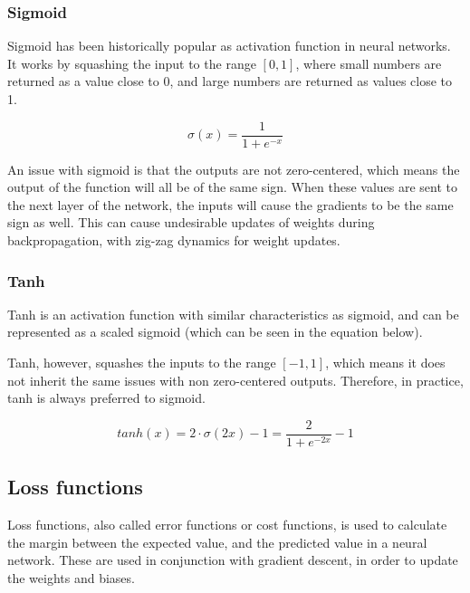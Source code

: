 \subsubsection{Sigmoid}

Sigmoid has been historically popular as activation function in neural networks. It works by squashing the input to the range $[0, 1]$, where small numbers are returned as a value close to 0, and large numbers are returned as values close to 1. 

\begin{equation} \label{eqn:sigmoid}
    \sigma(x) = \frac{1}{1 + e^{-x}}
\end{equation}

An issue with sigmoid is that the outputs are not zero-centered, which means the output of the function will all be of the same sign. When these values are sent to the next layer of the network, the inputs will cause the gradients to be the same sign as well. This can cause undesirable updates of weights during backpropagation, with zig-zag dynamics for weight updates. \cite{_neural_2018}

\subsubsection{Tanh}

Tanh is an activation function with similar characteristics as sigmoid, and can be represented as a scaled sigmoid (which can be seen in the equation below).

Tanh, however, squashes the inputs to the range $[-1, 1]$, which means it does not inherit the same issues with non zero-centered outputs. Therefore, in practice, tanh is always preferred to sigmoid. \cite{_neural_2018}

\begin{equation} \label{eqn:tanh}
    tanh(x) = 2 \cdot \sigma(2x) - 1 = \frac{2}{1+e^{-2x}} -1
\end{equation}

\subsection{Loss functions}
\label{loss_function}

Loss functions, also called error functions or cost functions, is used to calculate the margin between the expected value, and the predicted value in a neural network. These are used in conjunction with gradient descent, in order to update the weights and biases.

